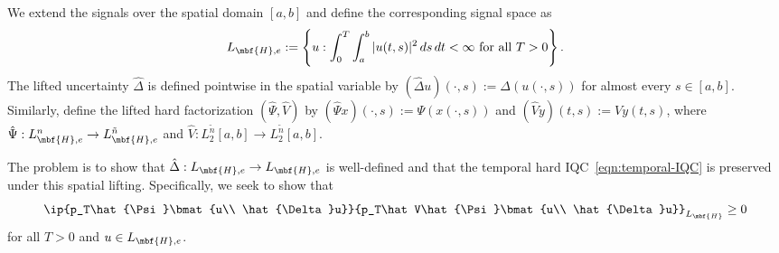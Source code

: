 \documentclass[11pt,a4paper,onecolumn]{article}
\theoremstyle{definition}
\theoremstyle{remark}
\begin{document}
We extend the signals over the spatial domain $[a,b]$ and define the
corresponding signal space as
\begin{equation}
    L_{\mbf{H},e}:=\left\{u:\int_0^T\int_a^b|u(t,s)|^2\,ds\,dt<\infty
    \text{ for all }T>0\right\}.
\end{equation}
The lifted uncertainty $\hat{\Delta}$ is defined pointwise in the spatial variable by
$(\hat{\Delta}u)(\cdot,s):=\Delta(u(\cdot,s))$ for almost every
$s\in[a,b]$. Similarly, define the lifted hard factorization
$(\hat{\Psi},\hat V)$ by
$(\hat{\Psi}x)(\cdot,s):=\Psi(x(\cdot,s))$ and
$(\hat Vy)(t,s):=Vy(t,s)$, where
$\hat{\Psi}:L_{\mbf{H},e}^n\to L_{\mbf{H},e}^{\tilde n}$ and
$\hat V:L_2^{\tilde n}[a,b]\to L_2^{\tilde n}[a,b]$. 

The problem is to show that
$\hat{\Delta}:L_{\mbf{H},e}\to L_{\mbf{H},e}$ is well-defined and that
the temporal hard IQC~\eqref{eqn:temporal-IQC} is preserved under this
spatial lifting. Specifically, we seek to show that
\begin{equation}\label{eqn:spatial-IQC}
    \ip{p_T\hat{\Psi}\bmat{u\\ \hat{\Delta}u}}{p_T\hat V\hat{\Psi}\bmat{u\\ \hat{\Delta}u}}_{L_{\mbf{H}}}\geq0
\end{equation}
for all $T>0$ and $u\in L_{\mbf{H},e}$.
\end{document}
